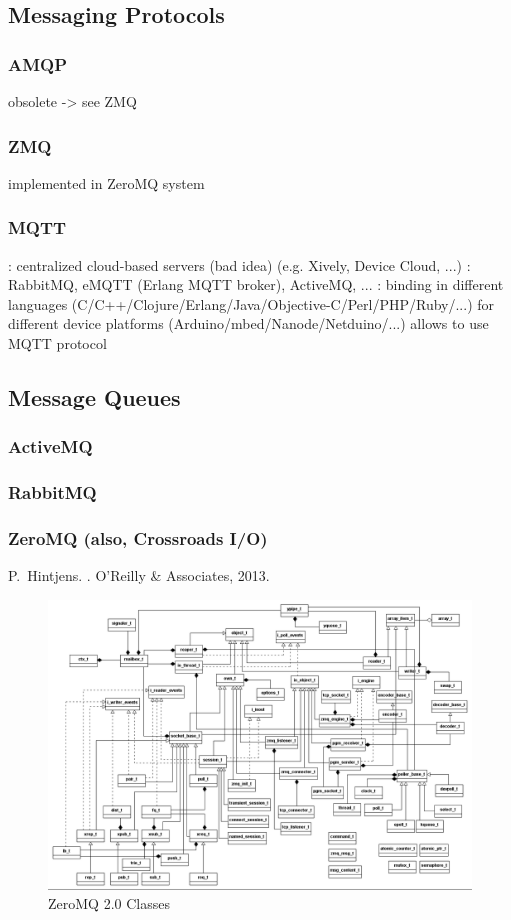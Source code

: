 \documentclass{myproc}
\begin{document}
\subsection{Messaging Protocols}
\subsubsection{AMQP}
\bit
\w obsolete -> see ZMQ
\eit
\subsubsection{\textcolor{red2}{\bf{}ZMQ}}
\bit
\w implemented in ZeroMQ system
\eit

\subsubsection{\textcolor{red2}{\bf{}MQTT}}
\bit
\w {}: centralized cloud-based servers (bad idea) (e.g. Xively,
Device Cloud, ...)
\w {}: RabbitMQ, eMQTT (Erlang MQTT broker), ActiveMQ, ...
\w {}: binding in different languages
(C/C++/Clojure/Erlang/Java/Objective-C/Perl/PHP/Ruby/...) for different
device platforms (Arduino/mbed/Nanode/Netduino/...) allows to use MQTT
protocol
\eit
\subsection{Message Queues}
\subsubsection{ActiveMQ}
\subsubsection{RabbitMQ}
\subsubsection{\textcolor{red2}{\bf{}ZeroMQ (also, Crossroads I/O)}}
\bit
\w P.~Hintjens.
.
\newblock O'Reilly \& Associates, 2013.
\eit

\begin{figure}[hbt]
\centerline{\includegraphics[width=16cm]{pics/zmq21-classes}}
\caption{ZeroMQ 2.0 Classes}
\end{figure}
\end{document}
